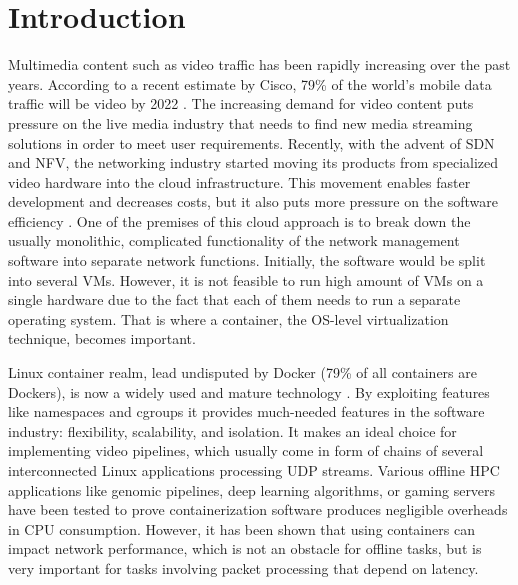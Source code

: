 \documentclass[english]{kththesis}
\begin{document}
\acknowlegmentssignature

\renewcommand{\chaptermark}[1]{ \markboth{#1}{}} 
\tableofcontents
  \markboth{\contentsname}{}

\cleardoublepage





\label{pg:lastPageofPreface}
\mainmatter

\renewcommand{\chaptermark}[1]{\markboth{#1}{}}
\chapter{Introduction}
\label{ch:introduction}
Multimedia content such as video traffic has been rapidly increasing over the past years. According to a recent estimate by Cisco, 79\% of the world's mobile data traffic will be video by 2022 \cite{cisco}. The increasing demand for video content puts pressure on the live media industry that needs to find new media streaming solutions in order to meet user requirements. Recently, with the advent of \gls{SDN} and \gls{NFV}, the networking industry started moving its products from specialized video hardware into the cloud infrastructure. This movement enables faster development and decreases costs, but it also puts more pressure on the software efficiency \cite{intro}. One of the premises of this cloud approach is to break down the usually monolithic, complicated functionality of the network management software into separate network functions. Initially, the software would be split into several  \glspl{VM}. However, it is not feasible to run high amount of \glspl{VM} on a single hardware due to the fact that each of them needs to run a separate operating system. That is where a container, the OS-level virtualization technique, becomes important. 

Linux container realm, lead undisputed by Docker (79\% of all containers are Dockers), is now a widely used and mature technology \cite{docker_stats}. By exploiting features like namespaces and cgroups it provides much-needed features in the software industry: flexibility, scalability, and isolation. It makes an ideal choice for implementing video pipelines, which usually come in form of chains of several interconnected Linux applications processing UDP streams. Various offline \gls{HPC} applications like genomic pipelines, deep learning algorithms, or gaming servers have been tested to prove containerization software produces negligible overheads in CPU consumption. However, it has been shown that using containers can impact network performance, which is not an obstacle for offline tasks, but is very important for tasks involving packet processing that depend on latency.
\end{document}
